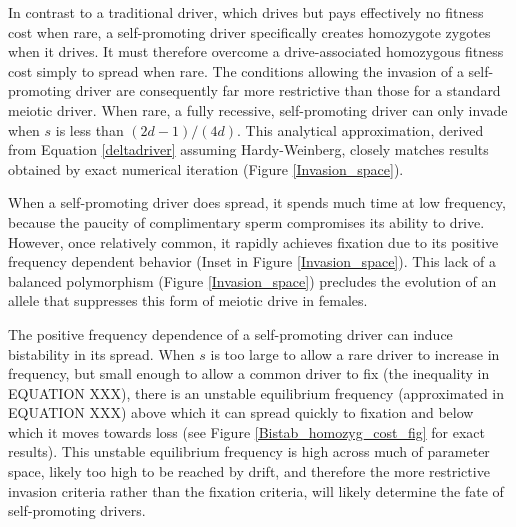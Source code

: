 \documentclass[12pt,letterpaper]{article}
\begin{document}
In contrast to a traditional driver, which drives but pays effectively
	no fitness cost when rare, 
	a self-promoting driver specifically creates homozygote
        zygotes when it drives. %
It must therefore overcome a drive-associated homozygous fitness cost simply to spread when rare. 
The conditions allowing the invasion of a self-promoting driver
 	are consequently far more restrictive than those for a standard meiotic driver.
When rare, a fully recessive, self-promoting driver can only invade when $s$ 
	is less than $(2 d - 1)/(4 d)$. 
This analytical approximation, derived from Equation \eqref{deltadriver} assuming Hardy-Weinberg, 
	closely matches results obtained by exact numerical iteration (Figure \ref{Invasion_space}). 


When a self-promoting driver does spread, 
	it spends much time at low frequency, 
	because the paucity of complimentary sperm compromises its ability to drive. 
However, once relatively common, it  rapidly achieves fixation due to its
	positive frequency dependent behavior (Inset in Figure \ref{Invasion_space}).  
This lack of a balanced polymorphism (Figure \ref{Invasion_space}) precludes the evolution of an
	allele that suppresses this form of meiotic drive in females.

The positive frequency dependence of a self-promoting driver can
induce bistability in its spread.
When $s$ is too large to allow a rare driver to increase in frequency, but small enough to allow a common driver to fix (the inequality in EQUATION XXX),
there is  an unstable equilibrium frequency (approximated in EQUATION XXX)  
	above which it can spread quickly to fixation and below which it moves towards loss 
	(see Figure \ref{Bistab_homozyg_cost_fig} for exact results).	
This unstable equilibrium frequency is high across much of
	parameter space, likely too high to be reached by drift, 
	and therefore the more restrictive invasion criteria rather than the fixation criteria, will  likely determine the fate of self-promoting drivers. 
\end{document}
